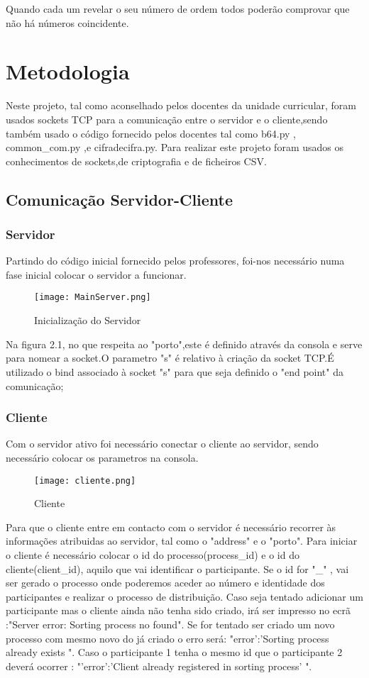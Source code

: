\documentclass{report}
\begin{document}
Quando cada um revelar o seu número de ordem todos poderão comprovar que não há números coincidente. 

\chapter{Metodologia}
\label{chap.metodologia}
Neste projeto, tal como aconselhado pelos docentes da unidade curricular, foram usados sockets TCP para a comunicação entre o servidor e o cliente,sendo também usado o código fornecido pelos docentes tal como b64.py , common\_com.py ,e cifradecifra.py.
\indent Para realizar este projeto foram usados os conhecimentos de sockets,de criptografia e de ficheiros CSV.
\pagebreak
\section{Comunicação Servidor-Cliente}
\subsection{Servidor}
Partindo do código inicial fornecido pelos professores, foi-nos necessário numa fase inicial colocar o servidor a funcionar.

\begin{figure}[hbt!]
  \centering
  \texttt{[image: MainServer.png]}
  \caption{Inicialização do Servidor}
\end{figure}
Na figura 2.1, no que respeita ao "porto",este é definido através da consola e serve para nomear a socket.O parametro "s" é relativo à criação da socket TCP.É utilizado o bind associado à socket "s" para que seja definido o "end point" da comunicação;
\pagebreak
\subsection{Cliente}
Com o servidor ativo foi necessário conectar o cliente ao servidor, sendo necessário colocar os parametros na consola.

\begin{figure}[hbt!]
  \centering
  \texttt{[image: cliente.png]}
  \caption{Cliente}
\end{figure}
Para que o cliente entre em contacto com o servidor é necessário recorrer às informações atribuidas ao servidor, tal como o "address" e o "porto".\newline
Para iniciar o cliente é necessário colocar o id do processo(process\_id) e o id do cliente(client\_id), aquilo que vai identificar o participante.\newline
\indent Se o id for "\_" , vai ser gerado o processo onde poderemos aceder ao número e identidade dos participantes e realizar o processo de distribuição.
\pagebreak
Caso seja tentado adicionar um participante mas o cliente ainda não tenha sido criado, irá ser impresso no ecrã :"Server error: Sorting process no found".
Se for tentado ser criado um novo processo com mesmo novo do já criado o erro será: "error':'Sorting process already exists ".
Caso o participante 1 tenha o mesmo id que o participante 2 deverá ocorrer : "'error':'Client already registered in sorting process' ".
\end{document}
